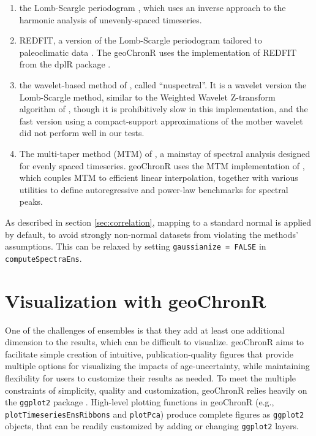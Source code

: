 \documentclass[gchron, manuscript]{copernicus}
\begin{document}
\begin{enumerate}
\def\labelenumi{\arabic{enumi}.}
\item
  the Lomb-Scargle periodogram \citep{VanderPlas_2018}, which uses an inverse approach to the harmonic analysis of unevenly-spaced timeseries.
\item
  REDFIT, a version of the Lomb-Scargle periodogram tailored to paleoclimatic data \citep{schulz2002, Mudelsee_02, Mudelsee_NPG09}.
  The geoChronR uses the implementation of REDFIT from the dplR package \citep{Bunn2008115}.
\item
  the wavelet-based method of \citet{Mathias_JSS04}, called ``nuspectral''. It is a wavelet version the Lomb-Scargle method, similar to the Weighted Wavelet Z-transform algorithm of \citet{Foster_AJ96}, though it is prohibitively slow in this implementation, and the fast version using a compact-support approximations of the mother wavelet did not perform well in our tests.
\item
  The multi-taper method (MTM) of \citet{thomson82}, a mainstay of spectral analysis \citep{Ghil02} designed for evenly spaced timeseries.
  geoChronR uses the MTM implementation of \citet{astrochron}, which couples MTM to efficient linear interpolation, together with various utilities to define autoregressive and power-law benchmarks for spectral peaks.
\end{enumerate}

As described in section \ref{sec:correlation}, mapping to a standard normal is applied by default, to avoid strongly non-normal datasets from violating the methods' assumptions.
This can be relaxed by setting \texttt{gaussianize\ =\ FALSE} in \texttt{computeSpectraEns}.

\hypertarget{sec:visualization}{%
\section{Visualization with geoChronR}\label{sec:visualization}}

One of the challenges of ensembles is that they add at least one additional dimension to the results, which can be difficult to visualize.
geoChronR aims to facilitate simple creation of intuitive, publication-quality figures that provide multiple options for visualizing the impacts of age-uncertainty, while maintaining flexibility for users to customize their results as needed.
To meet the multiple constraints of simplicity, quality and customization, geoChronR relies heavily on the \texttt{ggplot2} package \citep{ggplot2}.
High-level plotting functions in geoChronR (e.g., \texttt{plotTimeseriesEnsRibbons} and \texttt{plotPca}) produce complete figures as \texttt{ggplot2} objects, that can be readily customized by adding or changing \texttt{ggplot2} layers.
\end{document}
